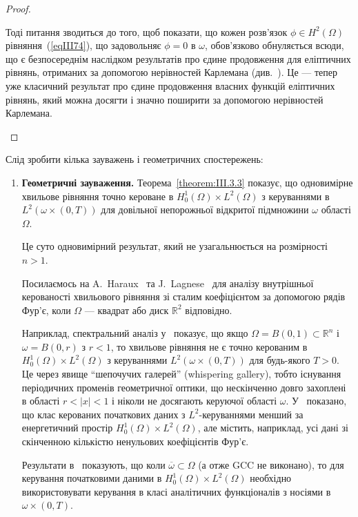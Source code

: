 \begin{enumerate}
\begin{proof}
\begin{enumerate}
Тоді питання зводиться до того, щоб показати, що кожен розв'язок $\phi \in H^2(\Omega)$ рівняння~(\ref{eqIII74}), що задовольняє
$
\phi = 0$ в $\omega$,
обов'язково обнуляється всюди, що є безпосереднім наслідком результатів про єдине продовження для еліптичних рівнянь, отриманих за допомогою нерівностей Карлемана (див.~\cite{hormander2007analysis}). Це — тепер уже класичний результат про єдине продовження власних функцій еліптичних рівнянь, який можна досягти і значно поширити за допомогою нерівностей Карлемана.
\end{enumerate}
\end{proof}

Слід зробити кілька зауважень і геометричних спостережень:
\begin{enumerate}
\item \textbf{Геометричні зауваження.} Теорема~\ref{theorem:III.3.3} показує, що одновимірне хвильове рівняння точно кероване в $H^1_{0}(\Omega) \times L^2(\Omega)$ з керуваннями в $L^2(\omega \times (0,T))$ для довільної непорожньої відкритої підмножини $\omega$ області $\Omega$.

Це суто одновимірний результат, який не узагальнюється на розмірності $n>1$.

Посилаємось на A.~Haraux~\cite{haraux1988controlabilite} та J.~Lagnese~\cite{lagnese1983control} для аналізу внутрішньої керованості хвильового рівняння зі сталим коефіцієнтом за допомогою рядів Фур'є, коли $\Omega$ — квадрат або диск $\mathbb{R}^2$ відповідно.

Наприклад, спектральний аналіз у~\cite{lagnese1983control} показує, що якщо $\Omega = B(0,1) \subset \mathbb{R}^n$ і $\omega = B(0,r)$ з $r<1$, то хвильове рівняння не є точно керованим в $H^1_{0}(\Omega) \times L^2(\Omega)$ з керуваннями $L^2(\omega \times (0,T))$ для будь-якого $T>0$. Це через явище ``шепочучих галерей'' (whispering gallery), тобто існування періодичних променів геометричної оптики, що нескінченно довго захоплені в області $r < |x| < 1$ і ніколи не досягають керуючої області $\omega$. У~\cite{lagnese1983control} показано, що клас керованих початкових даних з $L^2$-керуваннями менший за енергетичний простір $H^1_{0}(\Omega) \times L^2(\Omega)$, але містить, наприклад, усі дані зі скінченною кількістю ненульових коефіцієнтів Фур'є.

Результати в~\cite{haraux1988controlabilite} показують, що коли $\overline{\omega} \subset \Omega$ (а отже GCC не виконано), то для керування початковими даними в $H^1_{0}(\Omega) \times L^2(\Omega)$ необхідно використовувати керування в класі аналітичних функціоналів з носіями в $\omega \times (0,T)$.


\end{enumerate}
\end{enumerate}
